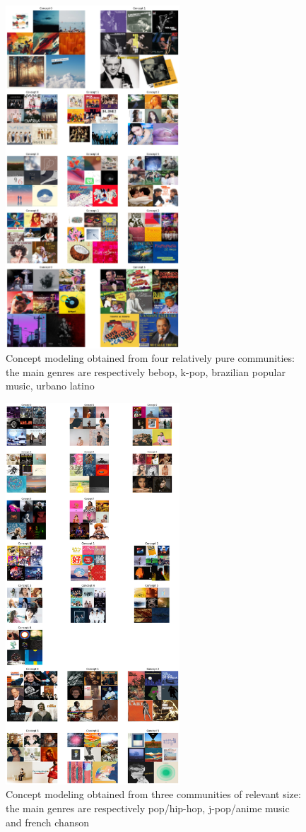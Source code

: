 \documentclass[sigchi]{acmart}
\begin{document}
\begin{figure}[H]
\centering
\includegraphics[width=6.5cm]{img/pic_1.png}
\caption{Concept modeling obtained from four relatively pure communities: the main genres are respectively bebop, k-pop, brazilian popular music, urbano latino}
\label{fig: cover_1}
\end{figure}

\begin{figure}[H]
\centering
\includegraphics[width=6.5cm]{img/pic_2.png}
\caption{Concept modeling obtained from three communities of relevant size: the main genres are respectively pop/hip-hop, j-pop/anime music and french chanson}
\label{fig: cover_2}
\end{figure}
\end{document}
